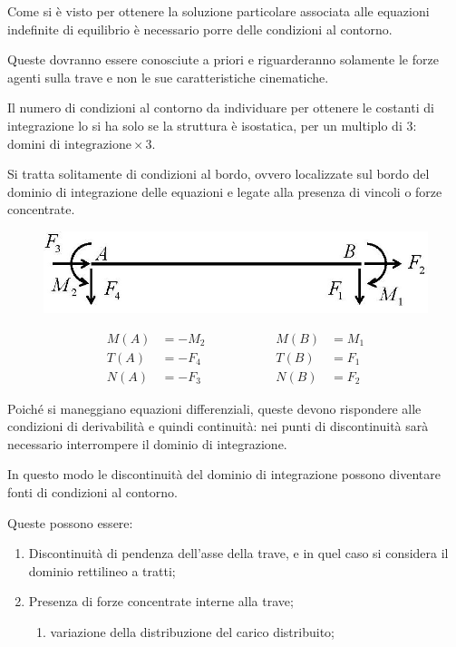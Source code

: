 \documentclass{article}
\begin{document}
\begin{adjustwidth}{2in}{}
	
	Come si è visto per ottenere la soluzione particolare associata alle equazioni indefinite di equilibrio è necessario porre
	delle condizioni al contorno.
	
	Queste dovranno essere conosciute a priori e riguarderanno solamente le forze agenti sulla trave e non le sue
	caratteristiche cinematiche.
	
	Il numero di condizioni al contorno da individuare per ottenere le costanti di integrazione lo si ha solo se la
	struttura è isostatica, per un multiplo di 3: $\text{domini di integrazione}\times 3$.	
	
	Si tratta solitamente di condizioni al bordo, ovvero localizzate sul bordo del dominio di integrazione delle
	equazioni e legate alla presenza di vincoli o forze concentrate.
\begin{figure}[H]
	\centering
	\includegraphics[width=0.3\linewidth]{"immagini/1.PARTE5_Pagina_14"}
\end{figure}
	\[
	\begin{split}
		M(A) & = -M_2 \\
		T(A) & = -F_4 \\
		N(A) & =-F_3
	\end{split} \hspace{2cm} \begin{split}
	M(B) & = M_1 \\
	T(B) & = F_1 \\
	N(B) & = F_2
\end{split}
	\]
	
	Poiché si maneggiano equazioni differenziali, queste devono rispondere alle condizioni di derivabilità e quindi continuità: nei punti di discontinuità sarà necessario interrompere il dominio di integrazione.
	
 	In questo modo le discontinuità del dominio di integrazione possono diventare fonti di condizioni al contorno.
 	
 	Queste possono essere: 
 	\begin{enumerate}
 		\item Discontinuità di pendenza dell'asse della trave, e in quel caso si considera il dominio rettilineo a tratti;
 		\item Presenza di forze concentrate interne alla trave;
 		\begin{enumerate}
 			\item variazione della distribuzione del carico distribuito;
 		\end{enumerate}
 	\end{enumerate}
 

\end{adjustwidth}
\end{document}
